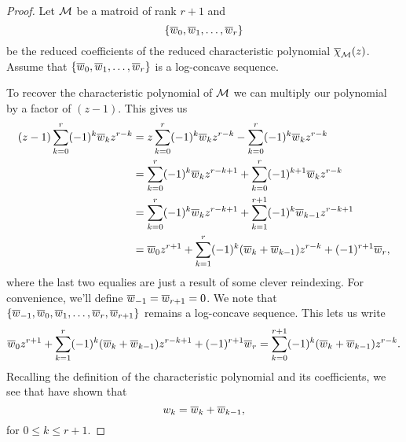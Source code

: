\documentclass[12pt,oneside]{../../sfsuthesis}
\begin{document}
\begin{proof}

    Let \( \mathcal{M} \) be a matroid of rank \( r + 1 \) and
    \[
        \{\overline{w}_0, \overline{w}_1, \dots, \overline{w}_r \}
    \]
    be the reduced coefficients of the reduced characteristic polynomial \( \overline{\chi}_{\mathcal{M}}(z) \).
    Assume that \( \{\overline{w}_0, \overline{w}_1, \dots, \overline{w}_r \} \) is a log-concave sequence.

    To recover the characteristic polynomial of \( \mathcal{M} \) we can multiply our polynomial by a factor of \( (z-1) \).
    This gives us
    \begin{align*}
        (z - 1)\sum_{k=0}^r(-1)^k \overline{w}_k z^{r-k} & = z\sum_{k=0}^r(-1)^k \overline{w}_k z^{r-k} - \sum_{k=0}^r(-1)^k \overline{w}_k z^{r-k}              \\
                                                & = \sum_{k=0}^r(-1)^k \overline{w}_k z^{r-k+1} + \sum_{k=0}^r(-1)^{k+1} \overline{w}_k z^{r-k}         \\
                                                & = \sum_{k=0}^r(-1)^k \overline{w}_k z^{r-k+1} + \sum_{k=1}^{r+1}(-1)^{k} \overline{w}_{k-1} z^{r-k+1} \\
                                                & = \overline{w}_0 z^{r+1} + \sum_{k=1}^r (-1)^k (\overline{w}_k + \overline{w}_{k-1})z^{r-k} + (-1)^{r+1}\overline{w}_r,
    \end{align*}
    where the last two equalies are just a result of some clever reindexing.
    For convenience, we'll define \( \overline{w}_{-1} = \overline{w}_{r+1} = 0 \).
    We note that \( \{ \overline{w}_{-1}, \overline{w}_0, \overline{w}_1, \dots, \overline{w}_r, \overline{w}_{r+1} \} \) remains a log-concave sequence.
    This lets us write
    \[
        \overline{w}_0 z^{r+1} + \sum_{k=1}^r (-1)^k (\overline{w}_k + \overline{w}_{k-1})z^{r-k+1} + (-1)^{r+1}\overline{w}_r = \sum_{k=0}^{r+1}(-1)^k(\overline{w}_k + \overline{w}_{k-1})z^{r-k}.
    \]
    Recalling the definition of the characteristic polynomial and its coefficients, we see that have shown that
    \[
        w_k = \overline{w}_k + \overline{w}_{k-1},
    \]
    for \( 0 \leq k \leq r+1 \).


\end{proof}
\end{document}
